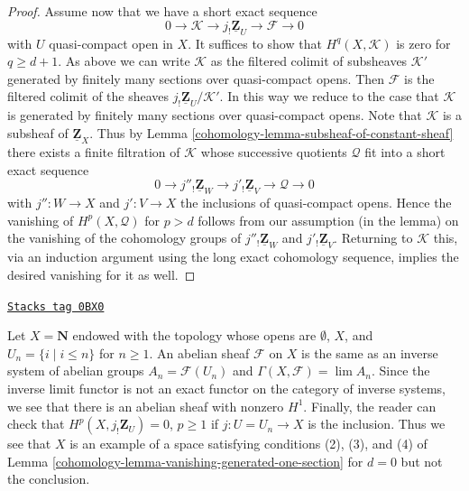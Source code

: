 \begin{proof}
\medskip\noindent
Assume now that we have a short exact sequence
$$
0 \to \mathcal{K} \to j_!\underline{\mathbf{Z}}_U \to \mathcal{F} \to 0
$$
with $U$ quasi-compact open in $X$.
It suffices to show that $H^q(X, \mathcal{K})$ is zero for $q \geq d + 1$.
As above we can write $\mathcal{K}$ as the filtered colimit of
subsheaves $\mathcal{K}'$ generated by finitely many sections over
quasi-compact opens. Then $\mathcal{F}$ is the filtered colimit of the
sheaves $j_!\underline{\mathbf{Z}}_U/\mathcal{K}'$. In this way we
reduce to the case that $\mathcal{K}$ is generated by finitely many
sections over quasi-compact opens. Note that $\mathcal{K}$
is a subsheaf of $\underline{\mathbf{Z}}_X$. Thus by
Lemma \ref{cohomology-lemma-subsheaf-of-constant-sheaf} there exists a finite
filtration of $\mathcal{K}$ whose successive quotients $\mathcal{Q}$ fit
into a short exact sequence
$$
0 \to j''_!\underline{\mathbf{Z}}_W \to
j'_!\underline{\mathbf{Z}}_V \to \mathcal{Q} \to 0
$$
with $j'' : W \to X$ and $j' : V \to X$ the inclusions of quasi-compact opens.
Hence the vanishing of $H^p(X, \mathcal{Q})$ for $p > d$ follows
from our assumption (in the lemma) on the vanishing of the cohomology groups
of $j''_!\underline{\mathbf{Z}}_W$ and $j'_!\underline{\mathbf{Z}}_V$.
Returning to $\mathcal{K}$ this, via an induction argument using the
long exact cohomology sequence, implies the desired vanishing for it as well.
\end{proof}

\begin{example}[Datta]
\label{cohomology-example-datta}
\href{https://stacks.math.columbia.edu/tag/0BX0}{\texttt{Stacks tag 0BX0}}

Let $X = \mathbf{N}$ endowed with the topology whose opens are
$\emptyset$, $X$, and $U_n = \{i \mid i \leq n\}$ for $n \geq 1$.
An abelian sheaf $\mathcal{F}$ on $X$ is the same as an inverse
system of abelian groups $A_n = \mathcal{F}(U_n)$ and
$\Gamma(X, \mathcal{F}) = \lim A_n$. Since the inverse limit
functor is not an exact functor on the category of inverse systems,
we see that there is an abelian sheaf with nonzero $H^1$.
Finally, the reader can check that $H^p(X, j_!\mathbf{Z}_U) = 0$,
$p \geq 1$ if $j : U = U_n \to X$ is the inclusion. Thus we see
that $X$ is an example of a space satisfying conditions (2), (3), and (4) of
Lemma \ref{cohomology-lemma-vanishing-generated-one-section} for $d = 0$
but not the conclusion.
\end{example}

